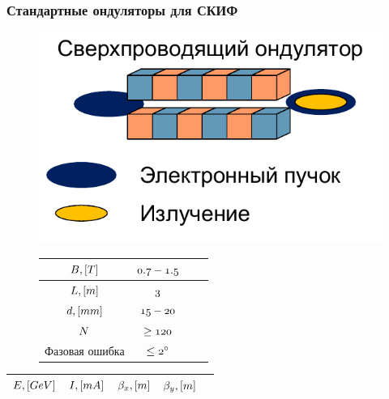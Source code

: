 \documentclass[14pt, hyperref = {colorlinks}]{beamer}
\begin{document}
\small
\begin{frame}
\frametitle{Стандартные ондуляторы для СКИФ}\label{t1}
\vspace{-10pt}
\begin{figure}[h]
	\begin{minipage}[h]{0.49\linewidth}
		\raggedright{\includegraphics[width=0.99\linewidth]{pic/sim_und.pdf}}
	\end{minipage}
	\begin{minipage}[h]{0.49\linewidth}
	\vspace{10pt}
	\begin{table}[h]
		\begin{tabular}{|c|c|c|c|}
			\hline\hline
			\rule{0pt}{3ex}$\mathnormal{B, [T]}$      & $\mathnormal{0.7 - 1.5}$   \\ \hline
			\rule{0pt}{3ex}$\mathnormal{L, [m]}$ 	  &  $\mathnormal{3}$        \\ \hline
			\rule{0pt}{3ex}$\mathnormal{d, [mm]}$     & $\mathnormal{15 - 20}$     \\ \hline
			\rule{0pt}{3ex}$\mathnormal{N}$           & $\mathnormal{\geq 120}$ \\ \hline
			\rule{0pt}{3ex}Фазовая ошибка &$\mathnormal{\leq 2^{\circ}}$  \\
			\hline
		\end{tabular}
	\end{table}
	\end{minipage}
\end{figure}
\vspace{-20pt}
\begin{table}[h]
	\begin{tabular}{|c|c|c|c|c|}
		\hline
		\hline
		\rule{0pt}{3ex}   $\mathnormal{E, [GeV]}$ & $\mathnormal{I, [mA]}$ & $\mathnormal{\beta_x, [m]}$ & $\mathnormal{\beta_{y}, [m]}$&\\ \hline

\end{tabular}
\end{table}
\end{frame}
\end{document}
